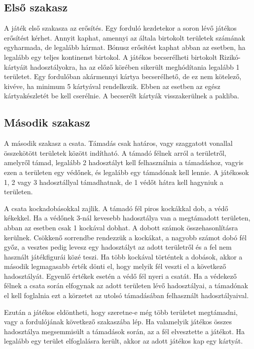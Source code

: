 \subsection*{Első szakasz}

A játék első szakasza az erősítés. Egy forduló kezdetekor a soron lévő játékos erősítést kérhet. Annyit kaphat, amennyi az általa birtokolt területek számának egyharmada, de legalább hármat. Bónusz erősítést kaphat abban az esetben, ha legalább egy teljes kontinenst birtokol. A játékos becserélheti birtokolt Rizikó-kártyáit hadosztályokra, ha az előző körében sikerült meghódítania legalább 1 területet. Egy fordulóban akármennyi kártya becserélhető, de ez nem kötelező, kivéve, ha minimum 5 kártyával rendelkezik. Ebben az esetben az egész kártyakészletét be kell cserélnie. A becserélt kártyák visszakerülnek a pakliba.

\subsection*{Második szakasz}

A második szakasz a csata. Támadás csak határos, vagy szaggatott vonallal összekötött területek között indítható. A támadó félnek arról a területről, amelyről támad, legalább 2 hadosztályt kell felhasználnia a támadáshoz, vagyis ezen a területen egy védőnek, és legalább egy támadónak kell lennie. A játékosok 1, 2 vagy 3 hadosztállyal támadhatnak, de 1 védőt hátra kell hagyniuk a területen.

A csata kockadobásokkal zajlik. A támadó fél piros kockákkal dob, a védő kékekkel. Ha a védőnek 3-nál kevesebb hadosztálya van a megtámadott területen, abban az esetben csak 1 kockával dobhat. A dobott számok összehasonlításra kerülnek. Csökkenő sorrendbe rendezzük a kockákat, a nagyobb számot dobó fél győz, a vesztes pedig levesz egy hadosztályt az adott területről és a fel nem használt játékfigurái közé teszi. Ha több kockával történtek a dobások, akkor a második legmagasabb érték dönti el, hogy melyik fél veszti el a következő hadosztályát. Egyenlő értékek esetén a védő fél nyeri a csatát. Ha a védekező félnek a csata során elfogynak az adott területen lévő hadosztályai, a támadónak el kell foglalnia ezt a körzetet az utolsó támadásában felhasznált hadosztályaival. 

Ezután a játékos eldöntheti, hogy szeretne-e még több területet megtámadni, vagy a fordulójának következő szakaszába lép. Ha valamelyik játékos összes hadosztálya megsemmisült a támadások során, az a fél elvesztette a játékot. Ha legalább egy terület elfoglalásra került, akkor az adott játékos kap egy kártyát.

